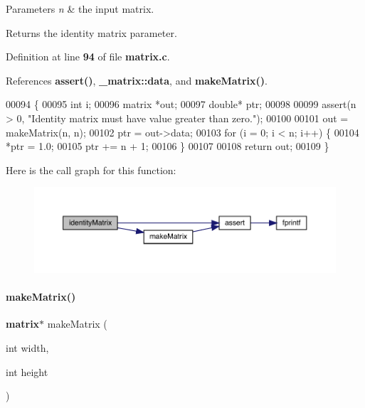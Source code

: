 \begin{DoxyParams}{Parameters}
{\em n} & the input matrix. \\
\hline
\end{DoxyParams}
\begin{DoxyReturn}{Returns}
the identity matrix parameter. 
\end{DoxyReturn}


Definition at line \textbf{ 94} of file \textbf{ matrix.\+c}.



References \textbf{ assert()}, \textbf{ \+\_\+matrix\+::data}, and \textbf{ make\+Matrix()}.


\begin{DoxyCode}
00094                               \{
00095     \textcolor{keywordtype}{int} i;
00096     matrix *out;
00097     \textcolor{keywordtype}{double}* ptr;
00098 
00099     assert(n > 0, \textcolor{stringliteral}{"Identity matrix must have value greater than zero."});
00100 
00101     out = makeMatrix(n, n);
00102     ptr = out->data;
00103     \textcolor{keywordflow}{for} (i = 0; i < n; i++) \{
00104         *ptr = 1.0;
00105         ptr += n + 1;
00106     \}
00107 
00108     \textcolor{keywordflow}{return} out;
00109 \}
\end{DoxyCode}
Here is the call graph for this function\+:\nopagebreak
\begin{figure}[H]
\begin{center}
\leavevmode
\includegraphics[width=350pt]{matrix_8c_aa3f5e409b1641373be7cf7284e216d1a_cgraph}
\end{center}
\end{figure}
\mbox{\label{matrix_8c_aae8b56c6fb44d9147b835f4006ca872c}} 
\paragraph{make\+Matrix()}
{\footnotesize\ttfamily \textbf{ matrix}$\ast$ make\+Matrix (\begin{DoxyParamCaption}\item[{int}]{width,  }\item[{int}]{height }\end{DoxyParamCaption})}



